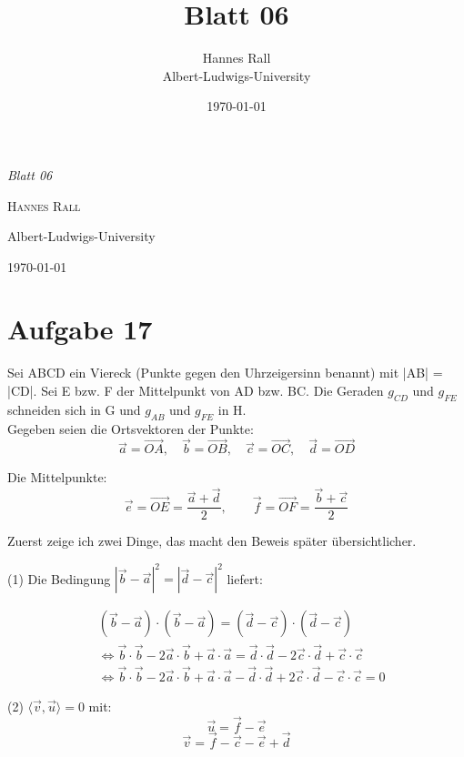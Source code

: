 \documentclass[12pt,a4paper]{article}
\title{Blatt 06}
\author{Hannes Rall \\ Albert-Ludwigs-University}
\date{\today}
\begin{document}
\begin{titlepage}
    \centering
    \vspace*{2cm}
    {\Huge\itshape Blatt 06\par}
    \vspace{2cm}
    {\Large\textsc{Hannes Rall}\par}
    \vfill
    {\large Albert-Ludwigs-University\\}
    \vspace{1cm}
    {\large\today\par}
\end{titlepage}
\newpage
\section*{Aufgabe 17}
Sei ABCD ein Viereck (Punkte gegen den Uhrzeigersinn benannt) mit |AB| = |CD|. Sei E bzw. F der
Mittelpunkt von AD bzw. BC. Die Geraden $g_{CD}$ und $g_{FE}$ schneiden sich in G und $g_{AB}$ und $g_{FE}$ in H.\\

\noindent Gegeben seien die Ortsvektoren der Punkte:
\[
\vec{a} = \overrightarrow{OA}, \quad
\vec{b} = \overrightarrow{OB}, \quad
\vec{c} = \overrightarrow{OC}, \quad
\vec{d} = \overrightarrow{OD}
\]

\noindent Die Mittelpunkte:
\[
\vec{e} = \overrightarrow{OE} = \frac{\vec{a} + \vec{d}}{2}, \qquad
\vec{f} = \overrightarrow{OF} = \frac{\vec{b} + \vec{c}}{2}
\]

\noindent Zuerst zeige ich zwei Dinge, das macht den Beweis später übersichtlicher.

\noindent (1) Die Bedingung $|\vec{b} - \vec{a}|^2 = |\vec{d} - \vec{c}|^2$ liefert:

\begin{align*}
    & (\vec{b} - \vec{a}) \cdot (\vec{b} - \vec{a}) = (\vec{d} - \vec{c}) \cdot (\vec{d} - \vec{c})\\
    & \Leftrightarrow \vec{b} \cdot \vec{b} - 2\vec{a} \cdot \vec{b} + \vec{a} \cdot \vec{a} = \vec{d} \cdot \vec{d} - 2\vec{c} \cdot \vec{d} + \vec{c} \cdot \vec{c}\\
    & \Leftrightarrow \vec{b} \cdot \vec{b} - 2\vec{a} \cdot \vec{b} + \vec{a} \cdot \vec{a} - \vec{d} \cdot \vec{d} + 2\vec{c} \cdot \vec{d} - \vec{c} \cdot \vec{c} = 0
\end{align*}

\noindent (2) $\langle \vec{v}, \vec{u} \rangle = 0$ mit:
\[
\vec{u} = \vec{f} - \vec{e}
\]
\[
\vec{v} = \vec{f} - \vec{c} - \vec{e} + \vec{d}
\]
\end{document}
